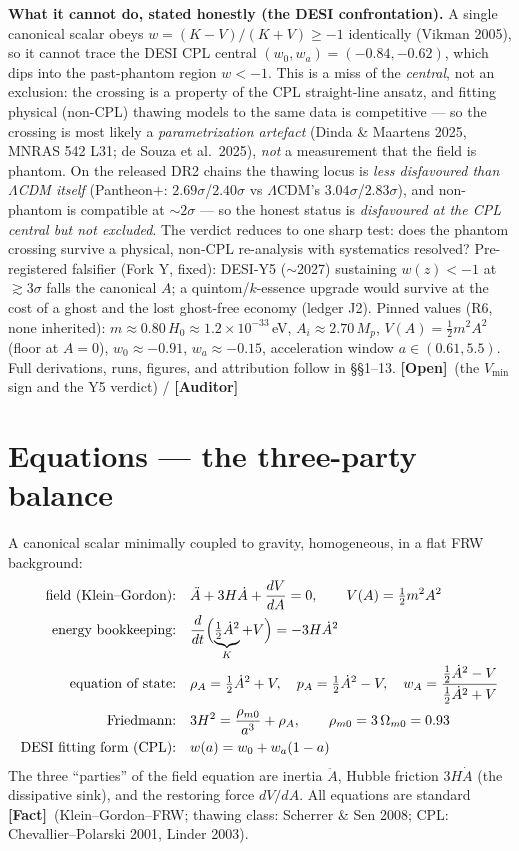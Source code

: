 \documentclass[11pt]{article}
\newcommand{\Fact}{\textbf{\textcolor{green!45!black}{[Fact]}}}
\newcommand{\Open}{\textbf{\textcolor{gray!10!black}{[Open]}}}
\newcommand{\Auditor}{\textbf{\textcolor{teal!55!black}{[Auditor]}}}
\begin{document}
\noindent\textbf{What it cannot do, stated honestly (the DESI confrontation).} A single canonical scalar obeys $w=(K-V)/(K+V)\ge-1$ identically (Vikman 2005), so it cannot trace the DESI CPL central $(w_0,w_a)=(-0.84,-0.62)$, which dips into the past-phantom region $w<-1$. This is a miss of the \emph{central}, not an exclusion: the crossing is a property of the CPL straight-line ansatz, and fitting physical (non-CPL) thawing models to the same data is competitive --- so the crossing is most likely a \emph{parametrization artefact} (Dinda \& Maartens 2025, MNRAS 542 L31; de Souza et al.\ 2025), \emph{not} a measurement that the field is phantom. On the released DR2 chains the thawing locus is \emph{less disfavoured than $\Lambda$CDM itself} (Pantheon$+$: $2.69\sigma$/$2.40\sigma$ vs $\Lambda$CDM's $3.04\sigma$/$2.83\sigma$), and non-phantom is compatible at $\sim2\sigma$ --- so the honest status is \emph{disfavoured at the CPL central but not excluded}. The verdict reduces to one sharp test: does the phantom crossing survive a physical, non-CPL re-analysis with systematics resolved? Pre-registered falsifier (Fork Y, fixed): DESI-Y5 ($\sim$2027) sustaining $w(z)<-1$ at $\gtrsim3\sigma$ falls the canonical $A$; a quintom/$k$-essence upgrade would survive at the cost of a ghost and the lost ghost-free economy (ledger J2). Pinned values (R6, none inherited): $m\approx0.80\,H_0\approx1.2\times10^{-33}$\,eV, $A_i\approx2.70\,M_p$, $V(A)=\tfrac12 m^2A^2$ (floor at $A=0$), $w_0\approx-0.91$, $w_a\approx-0.15$, acceleration window $a\in(0.61,5.5)$. Full derivations, runs, figures, and attribution follow in \S\S1--13. \Open\ (the $V_{\min}$ sign and the Y5 verdict) / \Auditor

\section{Equations --- the three-party balance}
A canonical scalar minimally coupled to gravity, homogeneous, in a flat FRW background:
\begin{align}
\text{field (Klein--Gordon):}\quad & \ddot A+3H\dot A+\frac{dV}{dA}=0,\qquad V(A)=\tfrac12 m^2A^2 \label{eq:p2kg}\\
\text{energy bookkeeping:}\quad & \frac{d}{dt}\Bigl(\underbrace{\tfrac12\dot A^2}_{K}+V\Bigr)=-3H\dot A^2 \label{eq:p2energy}\\
\text{equation of state:}\quad & \rho_A=\tfrac12\dot A^2+V,\quad p_A=\tfrac12\dot A^2-V,\quad
w_A=\frac{\tfrac12\dot A^2-V}{\tfrac12\dot A^2+V} \label{eq:p2eos}\\
\text{Friedmann:}\quad & 3H^2=\frac{\rho_{m0}}{a^3}+\rho_A,\qquad \rho_{m0}=3\,\Omega_{m0}=0.93 \label{eq:p2fried}\\
\text{DESI fitting form (CPL):}\quad & w(a)=w_0+w_a(1-a) \label{eq:p2cpl}
\end{align}
The three ``parties'' of the field equation are inertia $\ddot A$, Hubble friction $3H\dot A$ (the dissipative sink), and the restoring force $dV/dA$. All equations are standard \Fact\ (Klein--Gordon--FRW; thawing class: Scherrer \& Sen 2008; CPL: Chevallier--Polarski 2001, Linder 2003).
\end{document}
